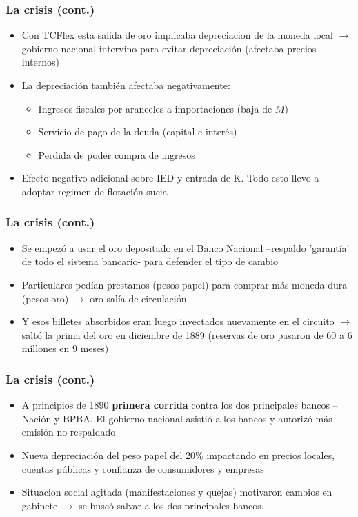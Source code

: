 \documentclass[14pt,aspectratio=169]{beamer}
\begin{document}
 \begin{frame}\frametitle{La crisis (cont.)}
     \begin{itemize}
     \item Con TCFlex esta salida de oro implicaba depreciacion de la
       moneda local $\longrightarrow$ gobierno nacional intervino para
       evitar depreciación (afectaba precios internos)
     \item La depreciación también afectaba negativamente:
       \begin{itemize}\itemsep 10pt \bigskip
         \item Ingresos fiscales por aranceles a importaciones (baja
           de $M$)
         \item Servicio de pago de la deuda (capital e interés)
         \item Perdida de poder compra de ingresos
         \end{itemize}
       \item Efecto negativo adicional sobre IED y entrada de
         K. Todo esto llevo a adoptar regimen de
           flotación sucia
     \end{itemize}
        \end{frame}



\begin{frame}\frametitle{La crisis (cont.)}
     \begin{itemize}
     \item Se empezó a usar el oro depositado en el Banco Nacional
       --respaldo 'garantía' de todo el sistema bancario- para
       defender el tipo de cambio
       \item Particulares pedían prestamos (pesos papel) para comprar más
         moneda dura (pesos oro) $\longrightarrow$ oro salía de
         circulación
         \item Y esos billetes absorbidos eran luego inyectados
           nuevamente en el circuito $\longrightarrow$ saltó la prima
           del oro en diciembre de 1889 (reservas de oro pasaron de 60
           a 6 millones en 9 meses)
     \end{itemize}
        \end{frame}
        


        \begin{frame}\frametitle{La crisis (cont.)}
     \begin{itemize}
     \item A principios de 1890 \textbf{primera corrida} contra los dos
       principales bancos --Nación y BPBA. El gobierno nacional
       asistió a los bancos y autorizó más emisión no respaldado
       \item Nueva depreciación del peso papel del 20\% impactando en
         precios locales, cuentas públicas y confianza de consumidores
         y empresas
         \item Situacion social agitada (manifestaciones y quejas)
           motivaron cambios en gabinete $\longrightarrow$ se buscó
           salvar a los dos principales bancos. 
     \end{itemize}
  \end{frame}
\end{document}
